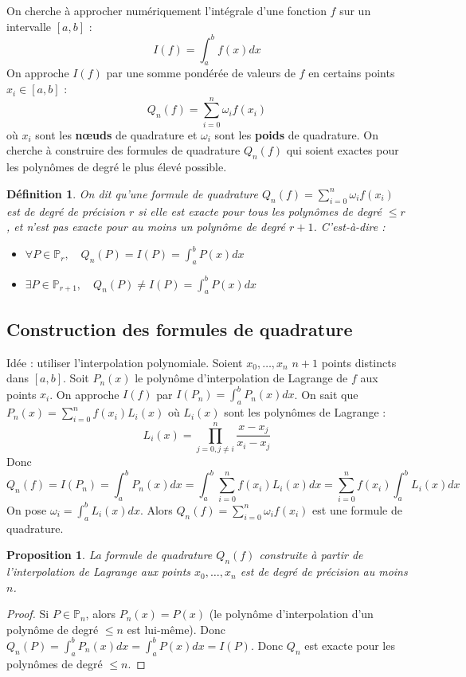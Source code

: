 \documentclass{article}
\newtheorem{proposition}[theorem]{Proposition}
\newtheorem{definition}{Définition}
\begin{document}
On cherche à approcher numériquement l'intégrale d'une fonction $f$ sur un intervalle $[a, b]$ :
\[
I(f) = \int_{a}^{b} f(x) dx
\]
On approche $I(f)$ par une somme pondérée de valeurs de $f$ en certains points $x_i \in [a, b]$ :
\[
Q_n(f) = \sum_{i=0}^{n} \omega_i f(x_i)
\]
où $x_i$ sont les \textbf{nœuds} de quadrature et $\omega_i$ sont les \textbf{poids} de quadrature.
On cherche à construire des formules de quadrature $Q_n(f)$ qui soient exactes pour les polynômes de degré le plus élevé possible.

\begin{definition}
On dit qu'une formule de quadrature $Q_n(f) = \sum_{i=0}^{n} \omega_i f(x_i)$ est de degré de précision $r$ si elle est exacte pour tous les polynômes de degré $\leq r$, et n'est pas exacte pour au moins un polynôme de degré $r+1$.
C'est-à-dire :
\begin{itemize}
    \item $\forall P \in \mathbb{P}_r, \quad Q_n(P) = I(P) = \int_{a}^{b} P(x) dx$
    \item $\exists P \in \mathbb{P}_{r+1}, \quad Q_n(P) \neq I(P) = \int_{a}^{b} P(x) dx$
\end{itemize}
\end{definition}

\subsection{Construction des formules de quadrature}

Idée : utiliser l'interpolation polynomiale.
Soient $x_0, \dots, x_n$ $n+1$ points distincts dans $[a, b]$.
Soit $P_n(x)$ le polynôme d'interpolation de Lagrange de $f$ aux points $x_i$.
On approche $I(f)$ par $I(P_n) = \int_{a}^{b} P_n(x) dx$.
On sait que $P_n(x) = \sum_{i=0}^{n} f(x_i) L_i(x)$ où $L_i(x)$ sont les polynômes de Lagrange :
\[
L_i(x) = \prod_{j=0, j\neq i}^{n} \frac{x - x_j}{x_i - x_j}
\]
Donc
\[
Q_n(f) = I(P_n) = \int_{a}^{b} P_n(x) dx = \int_{a}^{b} \sum_{i=0}^{n} f(x_i) L_i(x) dx = \sum_{i=0}^{n} f(x_i) \int_{a}^{b} L_i(x) dx
\]
On pose $\omega_i = \int_{a}^{b} L_i(x) dx$.
Alors $Q_n(f) = \sum_{i=0}^{n} \omega_i f(x_i)$ est une formule de quadrature.

\begin{proposition}
La formule de quadrature $Q_n(f)$ construite à partir de l'interpolation de Lagrange aux points $x_0, \dots, x_n$ est de degré de précision au moins $n$.
\end{proposition}
\begin{proof}
Si $P \in \mathbb{P}_n$, alors $P_n(x) = P(x)$ (le polynôme d'interpolation d'un polynôme de degré $\leq n$ est lui-même).
Donc $Q_n(P) = \int_{a}^{b} P_n(x) dx = \int_{a}^{b} P(x) dx = I(P)$.
Donc $Q_n$ est exacte pour les polynômes de degré $\leq n$.
\end{proof}
\end{document}
